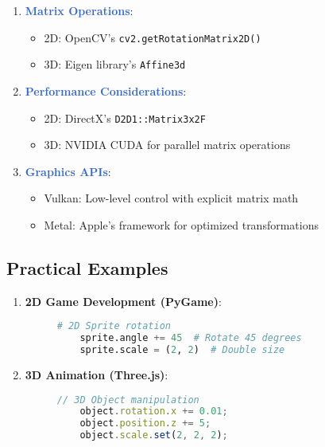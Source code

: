 \documentclass[12pt]{article}
\begin{document}
\begin{enumerate}
    \item \textcolor{highlight}{\textbf{Matrix Operations}}:
        \begin{itemize}
            \item 2D: OpenCV's \texttt{cv2.getRotationMatrix2D()}
            \item 3D: Eigen library's \texttt{Affine3d}
        \end{itemize}
    
    \item \textcolor{highlight}{\textbf{Performance Considerations}}:
        \begin{itemize}
            \item 2D: DirectX's \texttt{D2D1::Matrix3x2F}
            \item 3D: NVIDIA CUDA for parallel matrix operations
        \end{itemize}
    
    \item \textcolor{highlight}{\textbf{Graphics APIs}}:
        \begin{itemize}
            \item Vulkan: Low-level control with explicit matrix math
            \item Metal: Apple's framework for optimized transformations
        \end{itemize}
\end{enumerate}

\subsection{Practical Examples}

\begin{enumerate}
    \item \textbf{2D Game Development (PyGame)}:
    \begin{figure}[H]
    \begin{minipage}{\linewidth}
    \begin{lstlisting}[language=Python, caption=PyGame 2D Game Development]
    # 2D Sprite rotation
    sprite.angle += 45  # Rotate 45 degrees
    sprite.scale = (2, 2)  # Double size
    \end{lstlisting}
    \end{minipage}
    \end{figure}

    \item \textbf{3D Animation (Three.js)}:
    \begin{figure}[H]
    \begin{minipage}{\linewidth}
    \begin{lstlisting}[language=js, caption=Three.js 3D Animation]
    // 3D Object manipulation
    object.rotation.x += 0.01;
    object.position.z += 5;
    object.scale.set(2, 2, 2);
    \end{lstlisting}
    \end{minipage}
    \end{figure}
\end{enumerate}
\end{document}
